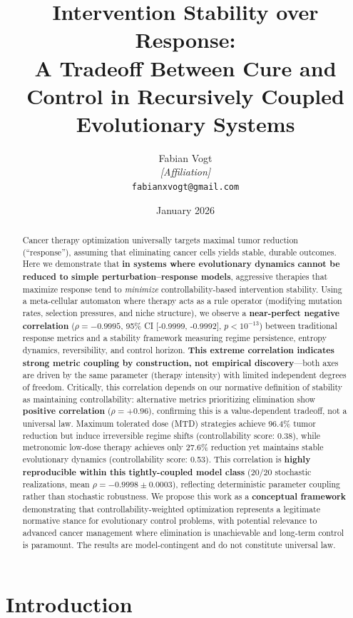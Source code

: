 \documentclass[11pt,a4paper]{article}
\title{\textbf{Intervention Stability over Response:\\A Tradeoff Between Cure and Control in Recursively Coupled Evolutionary Systems}}
\author{
Fabian Vogt\\
\small \textit{[Affiliation]}\\
\small \texttt{fabianxvogt@gmail.com}
}
\date{January 2026}
\begin{document}
\maketitle

\begin{abstract}
Cancer therapy optimization universally targets maximal tumor reduction (``response''), assuming that eliminating cancer cells yields stable, durable outcomes. Here we demonstrate that \textbf{in systems where evolutionary dynamics cannot be reduced to simple perturbation–response models}, aggressive therapies that maximize response tend to \textit{minimize} controllability-based intervention stability. Using a meta-cellular automaton where therapy acts as a rule operator (modifying mutation rates, selection pressures, and niche structure), we observe a \textbf{near-perfect negative correlation} ($\rho = -0.9995$, 95\% CI [-0.9999, -0.9992], $p < 10^{-13}$) between traditional response metrics and a stability framework measuring regime persistence, entropy dynamics, reversibility, and control horizon. \textbf{This extreme correlation indicates strong metric coupling by construction, not empirical discovery}---both axes are driven by the same parameter (therapy intensity) with limited independent degrees of freedom. Critically, this correlation depends on our normative definition of stability as maintaining controllability: alternative metrics prioritizing elimination show \textbf{positive correlation} ($\rho = +0.96$), confirming this is a value-dependent tradeoff, not a universal law. Maximum tolerated dose (MTD) strategies achieve 96.4\% tumor reduction but induce irreversible regime shifts (controllability score: 0.38), while metronomic low-dose therapy achieves only 27.6\% reduction yet maintains stable evolutionary dynamics (controllability score: 0.53). This correlation is \textbf{highly reproducible within this tightly-coupled model class} (20/20 stochastic realizations, mean $\rho = -0.9998 \pm 0.0003$), reflecting deterministic parameter coupling rather than stochastic robustness. We propose this work as a \textbf{conceptual framework} demonstrating that controllability-weighted optimization represents a legitimate normative stance for evolutionary control problems, with potential relevance to advanced cancer management where elimination is unachievable and long-term control is paramount. The results are model-contingent and do not constitute universal law.
\end{abstract}

\section{Introduction}
\end{document}
